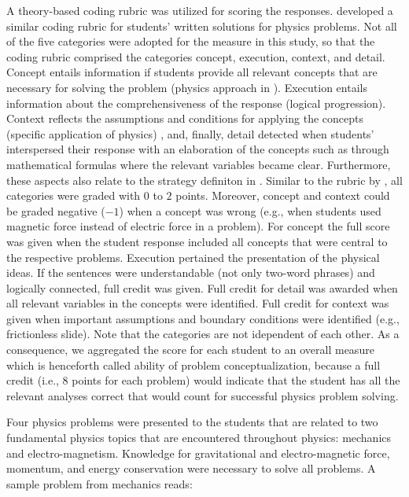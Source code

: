 \documentclass[]{interact}
\begin{document}
A theory-based coding rubric was utilized for scoring the responses. \cite{Docktor.2016} developed a similar coding rubric for students' written solutions for physics problems. Not all of the five categories were adopted for the measure in this study, so that the coding rubric comprised the categories concept, execution, context, and detail. Concept entails information if students provide all relevant concepts that are necessary for solving the problem (physics approach in \cite{Docktor.2016}). Execution entails information about the comprehensiveness of the response (logical progression). Context reflects the assumptions and conditions for applying the concepts (specific application of physics) \citep{Fortus.2009}, and, finally, detail detected when students' interspersed their response with an elaboration of the concepts such as through mathematical formulas where the relevant variables became clear. Furthermore, these aspects also relate to the strategy definiton in \cite{Leonard.1996}. Similar to the rubric by \cite{Docktor.2016}, all categories were graded with $0$ to $2$ points. Moreover, concept and context could be graded negative ($-1$) when a concept was wrong (e.g., when students used magnetic force instead of electric force in a problem). For concept the full score was given when the student response included all concepts that were central to the respective problems. Execution pertained the presentation of the physical ideas. If the sentences were understandable (not only two-word phrases) and logically connected, full credit was given. Full credit for detail was awarded when all relevant variables in the concepts were identified. Full credit for context was given when important assumptions and boundary conditions were identified (e.g., frictionless slide). Note that the categories are not idependent of each other. As a consequence, we aggregated the score for each student to an overall measure which is henceforth called ability of problem conceptualization, because a full credit (i.e., $8$ points for each problem) would indicate that the student has all the relevant analyses correct that would count for successful physics problem solving.

Four physics problems were presented to the students that are related to two fundamental physics topics that are encountered throughout physics: mechanics and electro-magnetism. Knowledge for gravitational and electro-magnetic force, momentum, and energy conservation were necessary to solve all problems. A sample problem from mechanics reads:
\end{document}
